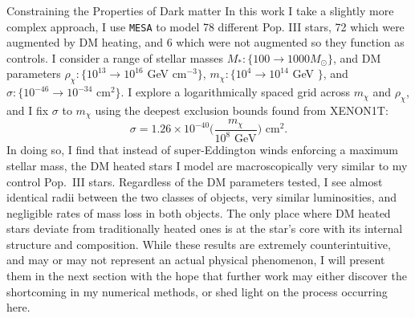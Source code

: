 \documentclass[a4paper,11pt]{article}
\begin{document}
\begin{section}{Constraining the Properties of Dark matter}
    In this work I take a slightly more complex approach, I use \texttt{MESA} to model 78 different Pop. III stars, 72 which were augmented by DM heating, and 6 which were not augmented so they function as controls.
    I consider a range of stellar masses $M_*: \{100 \to 1000 M_\odot \}$, and DM parameters $\rho_\chi: \{10^{13} \to 10^{16}$ GeV cm$^{-3}\}$, $m_\chi: \{10^4 \to 10^{14}$ GeV $\}$, and $\sigma: \{10^{-46} \to 10^{-34}$ cm$^2\}$. 
    I explore a logarithmically spaced grid across $m_\chi$ and $\rho_\chi$, and I fix $\sigma$ to $m_\chi$ using the deepest exclusion bounds found from XENON1T:
    \begin{equation}
        \sigma  = 1.26 \times 10^{-40} \bigg(\frac{m_\chi}{10^8 \text{ GeV}}\bigg) \text{ cm}^2.
    \end{equation}
    In doing so, I find that instead of super-Eddington winds enforcing a maximum stellar mass, the DM heated stars I model are macroscopically very similar to my control Pop.~III stars.
    Regardless of the DM parameters tested, I see almost identical radii between the two classes of objects, very similar luminosities, and negligible rates of mass loss in both objects. 
    The only place where DM heated stars deviate from traditionally heated ones is at the star's core with its internal structure and composition.
    While these results are extremely counterintuitive, and may or may not represent an actual physical phenomenon, I will present them in the next section with the hope that further work may either discover the shortcoming in my numerical methods, or shed light on the process occurring here.
\end{section}
\end{document}
